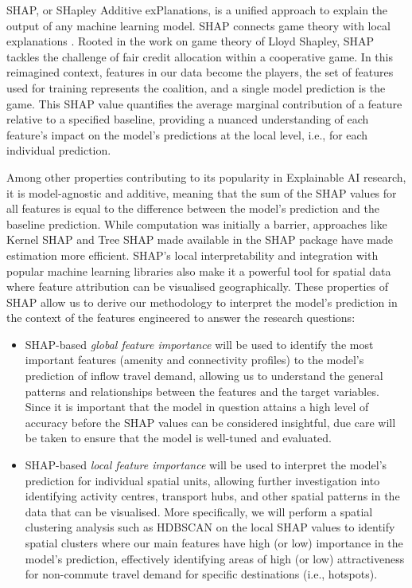 SHAP, or SHapley Additive exPlanations, is a unified approach to explain the output of any machine learning model. SHAP connects game theory with local explanations \citep{lundbergUnifiedApproachInterpreting2017a}. Rooted in the work on game theory of Lloyd Shapley, SHAP tackles the challenge of fair credit allocation within a cooperative game. In this reimagined context, features in our data become the players, the set of features used for training represents the coalition, and a single model prediction is the game. This SHAP value quantifies the average marginal contribution of a feature relative to a specified baseline, providing a nuanced understanding of each feature's impact on the model's predictions at the local level, i.e., for each individual prediction.

Among other properties contributing to its popularity in Explainable AI research, it is model-agnostic and additive, meaning that the sum of the SHAP values for all features is equal to the difference between the model's prediction and the baseline prediction. While computation was initially a barrier, approaches like Kernel SHAP and Tree SHAP made available in the SHAP package have made estimation more efficient. SHAP's local interpretability and integration with popular machine learning libraries also make it a powerful tool for spatial data where feature attribution can be visualised geographically. These properties of SHAP allow us to derive our methodology to interpret the model's prediction in the context of the features engineered to answer the research questions:

\begin{itemize}
\setlength\itemsep{0em} 
    \item SHAP-based \textit{global feature importance} will be used to identify the most important features (amenity and connectivity profiles) to the model's prediction of inflow travel demand, allowing us to understand the general patterns and relationships between the features and the target variables. Since it is important that the model in question attains a high level of accuracy before the SHAP values can be considered insightful, due care will be taken to ensure that the model is well-tuned and evaluated.
    \item SHAP-based \textit{local feature importance} will be used to interpret the model's prediction for individual spatial units, allowing further investigation into identifying activity centres, transport hubs, and other spatial patterns in the data that can be visualised. More specifically, we will perform a spatial clustering analysis such as HDBSCAN on the local SHAP values to identify spatial clusters where our main features have high (or low) importance in the model's prediction, effectively identifying areas of high (or low) attractiveness for non-commute travel demand for specific destinations (i.e., hotspots).
\end{itemize}

